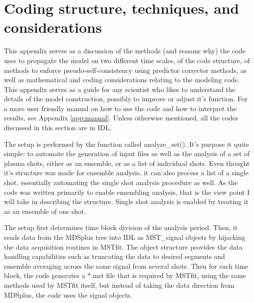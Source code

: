 \chapter{Coding structure, techniques, and considerations}\label{app:code}

This appendix serves as a discussion of the methods (and reasons why) the code uses to propagate the model on two different time scales, of the code structure, of methods to enforce pseudo-self-consistency using predictor corrector methods, as well as mathematical and coding considerations relating to the modeling code. This appendix serves as a guide for any scientist who likes to understand the details of the model construction, possibly to improve or adjust it's function. For a more user friendly manual on how to use the code and how to interpret the results, see Appendix \ref{app:manual}. Unless otherwise mentioned, all the codes discussed in this section are in IDL.




The setup is performed by the function called analyze\_set(). It's purpose it quite simple: to automate the generation of input files as well as the analysis of a set of plasma shots, either as an ensemble, or as a list of individual shots. Even thought it's structure was made for ensemble analysis, it can also process a list of a single shot, essentially automating the single shot analysis procedure as well. As the code was written primarily to enable ensembling analysis, that is the view point I will take in describing the structure. Single shot analysis is enabled by treating it as an ensemble of one shot. 

The setup first determines time block  division of the analysis period. Then, it reads data from the MDSplus tree into IDL as MST\_signal objects by hijacking the data acquisition routines in MSTfit. The object structure provides the data handling capabilities such as truncating the data to desired segments and ensemble averaging across the same signal from several shots. Then for each time block, the code generates a *.mst file that is required by MSTfit, using the same methods used by MSTfit itself, but instead of taking the data direction from MDSplus, the code uses the signal objects.
